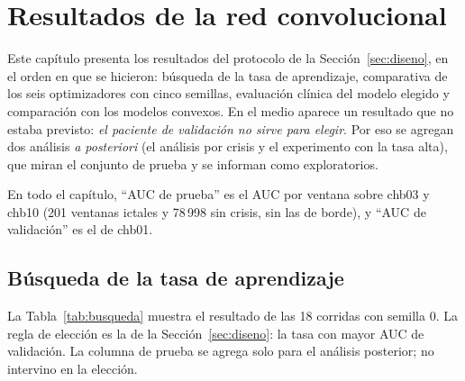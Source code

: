 \chapter{Resultados de la red convolucional}
\label{cap:resultados}

Este capítulo presenta los resultados del protocolo de la Sección~\ref{sec:diseno}, en el orden en que se hicieron:
búsqueda de la tasa de aprendizaje, comparativa de los seis optimizadores con cinco semillas, evaluación clínica del
modelo elegido y comparación con los modelos convexos. En el medio aparece un resultado que no estaba previsto:
\emph{el paciente de validación no sirve para elegir}. Por eso se agregan dos análisis \emph{a posteriori} (el análisis
por crisis y el experimento con la tasa alta), que miran el conjunto de prueba y se informan como exploratorios.

En todo el capítulo, ``AUC de prueba'' es el AUC por ventana sobre chb03 y chb10 (201 ventanas ictales y 78\,998 sin
crisis, sin las de borde), y ``AUC de validación'' es el de chb01.

\section{Búsqueda de la tasa de aprendizaje}
\label{sec:res_busqueda}

La Tabla~\ref{tab:busqueda} muestra el resultado de las 18 corridas con semilla 0. La regla de elección es la de la
Sección~\ref{sec:diseno}: la tasa con mayor AUC de validación. La columna de prueba se agrega solo para el análisis
posterior; no intervino en la elección.


